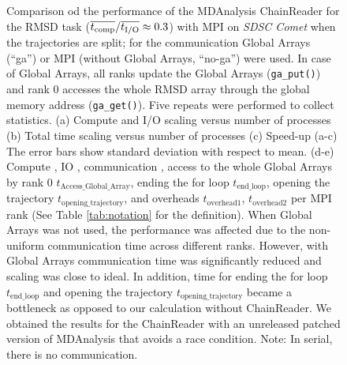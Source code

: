 \begin{figure}[ht!]
\caption{Comparison od the performance of the MDAnalysis ChainReader for the RMSD task ($\overline{{t}_{\text{comp}}}/\overline{{t}_{\text{I/O}}} \approx 0.3$)  with MPI on \emph{SDSC Comet} when the trajectories are split; for the communication Global Arrays (``ga'') or MPI (without Global Arrays, ``no-ga'') were used.
In case of Global Arrays, all ranks update the Global Arrays (\texttt{ga\_put()}) and rank 0 accesses the whole RMSD array through the global memory address (\texttt{ga\_get()}).
Five repeats were performed to collect statistics. (a) Compute and I/O scaling versus number of processes (b) Total time scaling versus number of processes (c) Speed-up (a-c) The error bars show standard deviation with respect to mean. (d-e) Compute \tcomp, IO \tIO, communication \tcomm, access to the whole Global Arrays by rank 0 $t_{\text{Access\_Global\_Array}}$, ending the for loop $t_{\text{end\_loop}}$,
  opening the trajectory $t_{\text{opening\_trajectory}}$, and overheads $t_{\text{overhead1}}$, $t_{\text{overhead2}}$ per MPI rank (See Table \ref{tab:notation} for the definition). When Global Arrays was not used, the performance was affected due to the non-uniform communication time across different ranks. However, with Global Arrays communication time was significantly reduced and scaling was close to ideal. In addition, time for ending the for loop $t_{\text{end\_loop}}$ and 
opening the trajectory $t_{\text{opening\_trajectory}}$ became a bottleneck as opposed to our calculation without ChainReader. We obtained the results for the ChainReader with an unreleased patched version of MDAnalysis that avoids a race condition. Note: In serial, there is no communication.}
\label{fig:MPIwithIO-split-chain-reader}
\end{figure}

